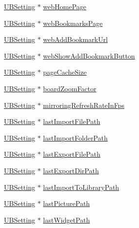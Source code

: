 \begin{DoxyCompactItemize}
\item 
\hyperlink{class_u_b_setting}{U\-B\-Setting} $\ast$ \hyperlink{class_u_b_settings_a81373d964e3fa4a318429ff86ba291ae}{web\-Home\-Page}
\item 
\hyperlink{class_u_b_setting}{U\-B\-Setting} $\ast$ \hyperlink{class_u_b_settings_ac95325200a02330d13b31458916a2d4a}{web\-Bookmarks\-Page}
\item 
\hyperlink{class_u_b_setting}{U\-B\-Setting} $\ast$ \hyperlink{class_u_b_settings_aa3b76ba241083298570f0aa7891cd1f3}{web\-Add\-Bookmark\-Url}
\item 
\hyperlink{class_u_b_setting}{U\-B\-Setting} $\ast$ \hyperlink{class_u_b_settings_ae9ed072bbf0fed079bba6a8e976fa4d5}{web\-Show\-Add\-Bookmark\-Button}
\item 
\hyperlink{class_u_b_setting}{U\-B\-Setting} $\ast$ \hyperlink{class_u_b_settings_aac2ebdada657a3505f3e3b924a02e4f8}{page\-Cache\-Size}
\item 
\hyperlink{class_u_b_setting}{U\-B\-Setting} $\ast$ \hyperlink{class_u_b_settings_af8854a651e7804e91c962491b98a9dd7}{board\-Zoom\-Factor}
\item 
\hyperlink{class_u_b_setting}{U\-B\-Setting} $\ast$ \hyperlink{class_u_b_settings_a844761cf83bfd8eb2885fbbd4f89e82f}{mirroring\-Refresh\-Rate\-In\-Fps}
\item 
\hyperlink{class_u_b_setting}{U\-B\-Setting} $\ast$ \hyperlink{class_u_b_settings_acd595117bf50e916afa5e0639d656227}{last\-Import\-File\-Path}
\item 
\hyperlink{class_u_b_setting}{U\-B\-Setting} $\ast$ \hyperlink{class_u_b_settings_a9d57a5cf038caefb6a2ed1f169b19ae6}{last\-Import\-Folder\-Path}
\item 
\hyperlink{class_u_b_setting}{U\-B\-Setting} $\ast$ \hyperlink{class_u_b_settings_ac09981b17cde076f6c2b902b63dfe2cd}{last\-Export\-File\-Path}
\item 
\hyperlink{class_u_b_setting}{U\-B\-Setting} $\ast$ \hyperlink{class_u_b_settings_adb4eebdbd8f10570191b00dab66f76ca}{last\-Export\-Dir\-Path}
\item 
\hyperlink{class_u_b_setting}{U\-B\-Setting} $\ast$ \hyperlink{class_u_b_settings_a8f07c9c5f1acc312c384f91da004eda7}{last\-Import\-To\-Library\-Path}
\item 
\hyperlink{class_u_b_setting}{U\-B\-Setting} $\ast$ \hyperlink{class_u_b_settings_a521b887a58000c11bcac7b0d85b5ba95}{last\-Picture\-Path}
\item 
\hyperlink{class_u_b_setting}{U\-B\-Setting} $\ast$ \hyperlink{class_u_b_settings_ad2545490b7627629f168dc9cf7f253d2}{last\-Widget\-Path}

\end{DoxyCompactItemize}
